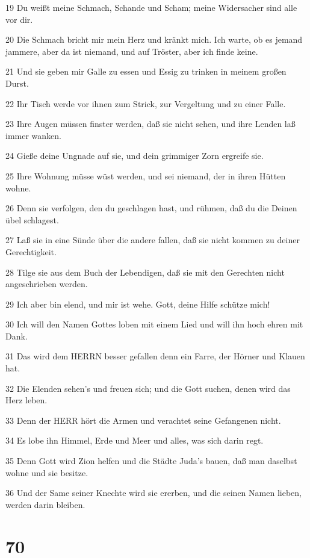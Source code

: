 \par 19 Du weißt meine Schmach, Schande und Scham; meine Widersacher sind alle vor dir.
\par 20 Die Schmach bricht mir mein Herz und kränkt mich. Ich warte, ob es jemand jammere, aber da ist niemand, und auf Tröster, aber ich finde keine.
\par 21 Und sie geben mir Galle zu essen und Essig zu trinken in meinem großen Durst.
\par 22 Ihr Tisch werde vor ihnen zum Strick, zur Vergeltung und zu einer Falle.
\par 23 Ihre Augen müssen finster werden, daß sie nicht sehen, und ihre Lenden laß immer wanken.
\par 24 Gieße deine Ungnade auf sie, und dein grimmiger Zorn ergreife sie.
\par 25 Ihre Wohnung müsse wüst werden, und sei niemand, der in ihren Hütten wohne.
\par 26 Denn sie verfolgen, den du geschlagen hast, und rühmen, daß du die Deinen übel schlagest.
\par 27 Laß sie in eine Sünde über die andere fallen, daß sie nicht kommen zu deiner Gerechtigkeit.
\par 28 Tilge sie aus dem Buch der Lebendigen, daß sie mit den Gerechten nicht angeschrieben werden.
\par 29 Ich aber bin elend, und mir ist wehe. Gott, deine Hilfe schütze mich!
\par 30 Ich will den Namen Gottes loben mit einem Lied und will ihn hoch ehren mit Dank.
\par 31 Das wird dem HERRN besser gefallen denn ein Farre, der Hörner und Klauen hat.
\par 32 Die Elenden sehen's und freuen sich; und die Gott suchen, denen wird das Herz leben.
\par 33 Denn der HERR hört die Armen und verachtet seine Gefangenen nicht.
\par 34 Es lobe ihn Himmel, Erde und Meer und alles, was sich darin regt.
\par 35 Denn Gott wird Zion helfen und die Städte Juda's bauen, daß man daselbst wohne und sie besitze.
\par 36 Und der Same seiner Knechte wird sie ererben, und die seinen Namen lieben, werden darin bleiben.

\chapter{70}

